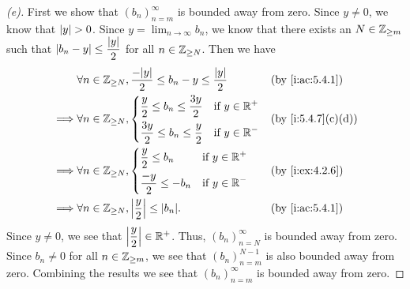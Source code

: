 \begin{proof}[(e)]
  First we show that \((b_n)_{n = m}^\infty\) is bounded away from zero.
  Since \(y \neq 0\), we know that \(\left\lvert y\right\rvert > 0\).
  Since \(y = \lim_{n \to \infty} b_n\), we know that there exists an \(N \in \mathbb{Z}_{\geq m}\) such that \(\left\lvert b_n - y\right\rvert \leq \dfrac{\left\lvert y\right\rvert}{2}\) for all \(n \in \mathbb{Z}_{\geq N}\).
  Then we have
  \begin{align*}
             & \forall n \in \Z_{\geq N}, \dfrac{-\abs{y}}{2} \leq b_n - y \leq \dfrac{\abs{y}}{2} &  & \by{i:ac:5.4.1} \\
    \implies & \forall n \in \Z_{\geq N}, \begin{dcases}
                                            \dfrac{y}{2} \leq b_n \leq \dfrac{3y}{2} & \text{if } y \in \R^+ \\
                                            \dfrac{3y}{2} \leq b_n \leq \dfrac{y}{2} & \text{if } y \in \R^-
                                          \end{dcases}                 &  & \by{i:5.4.7}[c,d]              \\
    \implies & \forall n \in \Z_{\geq N}, \begin{dcases}
                                            \dfrac{y}{2} \leq b_n   & \text{if } y \in \R^+ \\
                                            \dfrac{-y}{2} \leq -b_n & \text{if } y \in \R^-
                                          \end{dcases}                                  &  & \by{i:ex:4.2.6}            \\
    \implies & \forall n \in \Z_{\geq N}, \abs{\dfrac{y}{2}} \leq \abs{b_n}.                       &  & \by{i:ac:5.4.1}
  \end{align*}
  Since \(y \neq 0\), we see that \(\left\lvert\dfrac{y}{2}\right\rvert \in \mathbb{R}^+\).
  Thus, \((b_n)_{n = N}^\infty\) is bounded away from zero.
  Since \(b_n \neq 0\) for all \(n \in \mathbb{Z}_{\geq m}\), we see that \((b_n)_{n = m}^{N - 1}\) is also bounded away from zero.
  Combining the results we see that \((b_n)_{n = m}^\infty\) is bounded away from zero.


\end{proof}
